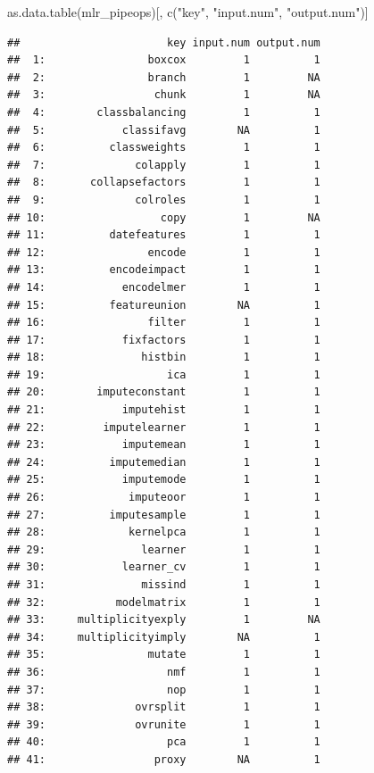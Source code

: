 \documentclass[
]{scrbook}
\newenvironment{Shaded}{\begin{snugshade}}{\end{snugshade}}
\newcommand{\FunctionTok}[1]{\textcolor[rgb]{0.00,0.00,0.00}{#1}}
\newcommand{\NormalTok}[1]{#1}
\newcommand{\StringTok}[1]{\textcolor[rgb]{0.31,0.60,0.02}{#1}}
\renewenvironment{Shaded} {\begin{snugshade}\small} {\end{snugshade}}
\begin{document}
\begin{Shaded}
\begin{Highlighting}[]
\FunctionTok{as.data.table}\NormalTok{(mlr\_pipeops)[, }\FunctionTok{c}\NormalTok{(}\StringTok{"key"}\NormalTok{, }\StringTok{"input.num"}\NormalTok{, }\StringTok{"output.num"}\NormalTok{)]}
\end{Highlighting}
\end{Shaded}

\begin{verbatim}
##                       key input.num output.num
##  1:                boxcox         1          1
##  2:                branch         1         NA
##  3:                 chunk         1         NA
##  4:        classbalancing         1          1
##  5:            classifavg        NA          1
##  6:          classweights         1          1
##  7:              colapply         1          1
##  8:       collapsefactors         1          1
##  9:              colroles         1          1
## 10:                  copy         1         NA
## 11:          datefeatures         1          1
## 12:                encode         1          1
## 13:          encodeimpact         1          1
## 14:            encodelmer         1          1
## 15:          featureunion        NA          1
## 16:                filter         1          1
## 17:            fixfactors         1          1
## 18:               histbin         1          1
## 19:                   ica         1          1
## 20:        imputeconstant         1          1
## 21:            imputehist         1          1
## 22:         imputelearner         1          1
## 23:            imputemean         1          1
## 24:          imputemedian         1          1
## 25:            imputemode         1          1
## 26:             imputeoor         1          1
## 27:          imputesample         1          1
## 28:             kernelpca         1          1
## 29:               learner         1          1
## 30:            learner_cv         1          1
## 31:               missind         1          1
## 32:           modelmatrix         1          1
## 33:     multiplicityexply         1         NA
## 34:     multiplicityimply        NA          1
## 35:                mutate         1          1
## 36:                   nmf         1          1
## 37:                   nop         1          1
## 38:              ovrsplit         1          1
## 39:              ovrunite         1          1
## 40:                   pca         1          1
## 41:                 proxy        NA          1

\end{verbatim}
\end{document}
